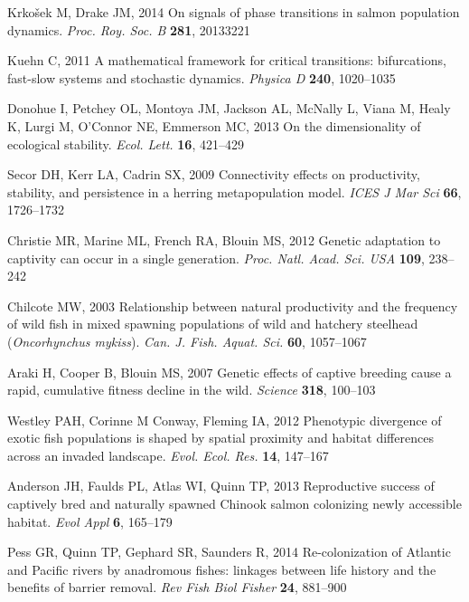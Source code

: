 \documentclass{revtex4}
\begin{document}
\begin{thebibliography}{10}
Krko{\v s}ek M, Drake JM, 2014 {On signals of phase transitions in salmon
  population dynamics}.
\newblock \emph{Proc. Roy. Soc. B} \textbf{281}, 20133221

Kuehn C, 2011 {A mathematical framework for critical transitions: bifurcations,
  fast-slow systems and stochastic dynamics}.
\newblock \emph{Physica D} \textbf{240}, 1020--1035

Donohue I, Petchey OL, Montoya JM, Jackson AL, McNally L, Viana M, Healy K,
  Lurgi M, O'Connor NE, Emmerson MC, 2013 {On the dimensionality of ecological
  stability.}
\newblock \emph{Ecol. Lett.} \textbf{16}, 421--429

Secor DH, Kerr LA, Cadrin SX, 2009 {Connectivity effects on productivity,
  stability, and persistence in a herring metapopulation model}.
\newblock \emph{ICES J Mar Sci} \textbf{66}, 1726--1732

Christie MR, Marine ML, French RA, Blouin MS, 2012 {Genetic adaptation to
  captivity can occur in a single generation.}
\newblock \emph{Proc. Natl. Acad. Sci. USA} \textbf{109}, 238--242

Chilcote MW, 2003 {Relationship between natural productivity and the frequency
  of wild fish in mixed spawning populations of wild and hatchery steelhead
  (\emph{Oncorhynchus mykiss})}.
\newblock \emph{Can. J. Fish. Aquat. Sci.} \textbf{60}, 1057--1067

Araki H, Cooper B, Blouin MS, 2007 {Genetic effects of captive breeding cause a
  rapid, cumulative fitness decline in the wild}.
\newblock \emph{Science} \textbf{318}, 100--103

Westley PAH, { Corinne M Conway}, Fleming IA, 2012 {Phenotypic divergence of
  exotic fish populations is shaped by spatial proximity and habitat
  differences across an invaded landscape}.
\newblock \emph{Evol. Ecol. Res.} \textbf{14}, 147--167

Anderson JH, Faulds PL, Atlas WI, Quinn TP, 2013 {Reproductive success of
  captively bred and naturally spawned Chinook salmon colonizing newly
  accessible habitat}.
\newblock \emph{Evol Appl} \textbf{6}, 165--179

Pess GR, Quinn TP, Gephard SR, Saunders R, 2014 {Re-colonization of Atlantic
  and Pacific rivers by anadromous fishes: linkages between life history and
  the benefits of barrier removal}.
\newblock \emph{Rev Fish Biol Fisher} \textbf{24}, 881--900


\end{thebibliography}
\end{document}

